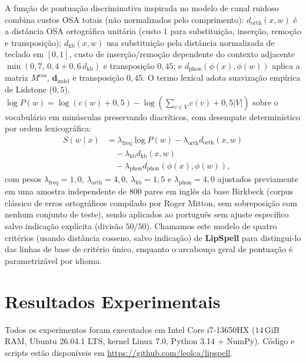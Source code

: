 \documentclass[a4paper, twocolumn, 11pt, twoside]{article}
\begin{document}
A função de pontuação discriminativa inspirada no modelo de canal ruidoso combina custos OSA totais (não normalizados pelo comprimento): $d_{\text{orth}}(x,w)$ é a distância OSA ortográfica unitária (custo $1$ para substituição, inserção, remoção e transposição); $d_{\text{kb}}(x,w)$ usa substituição pela distância normalizada de teclado em $[0,1]$, custo de inserção/remoção dependente do contexto adjacente $\min(0{,}7,\, 0{,}4 + 0{,}6\, d_{\text{kb}})$ e transposição $0{,}45$; e $d_{\text{phon}}(\phi(x),\phi(w))$ aplica a matriz $M^{\cos}$, $\mathbf{d}_{\text{indel}}$ e transposição $0{,}45$. O termo lexical adota suavização empírica de Lidstone ($0{,}5$), $\log P(w)=\log(c(w)+0{,}5)-\log(\sum_{v\in V}c(v)+0{,}5|V|)$ sobre o vocabulário em minúsculas preservando diacríticos, com desempate determinístico por ordem lexicográfica:
\begin{equation}
\begin{aligned}
    S(w \mid x) &= \lambda_{\text{freq}} \log P(w) - \lambda_{\text{orth}} d_{\text{orth}}(x,w) \\
                &\quad - \lambda_{\text{kb}} d_{\text{kb}}(x,w) \\
                &\quad - \lambda_{\text{phon}} d_{\text{phon}}(\phi(x),\phi(w)),
\end{aligned}
\end{equation}%
com pesos $\lambda_{\text{freq}}=1{,}0$, $\lambda_{\text{orth}}=4{,}0$, $\lambda_{\text{kb}}=1{,}5$ e $\lambda_{\text{phon}}=4{,}0$ ajustados previamente em uma amostra independente de $800$ pares em inglês da base Birkbeck \citep{mitton1985birkbeck} (corpus clássico de erros ortográficos compilado por Roger Mitton, sem sobreposição com nenhum conjunto de teste), sendo aplicados ao português sem ajuste específico salvo indicação explícita (divisão $50/50$). Chamamos este modelo de quatro critérios (usando distância cosseno, salvo indicação) de \textbf{LipSpell} para distingui-lo das linhas de base de critério único, enquanto o arcabouço geral de pontuação é parametrizável por idioma.

\section{Resultados Experimentais}
Todos os experimentos foram executados em Intel Core i7-13650HX ($14$\,GiB RAM, Ubuntu 26.04.1 LTS, kernel Linux 7.0, Python 3.14 + NumPy). Código e scripts estão disponíveis em \url{https://github.com/leolca/lipspell}.
\end{document}
